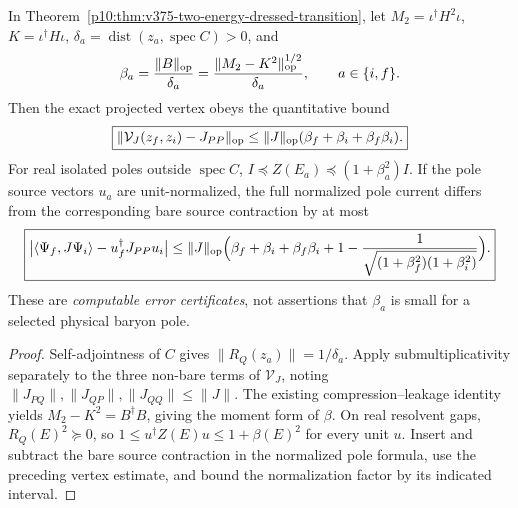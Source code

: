 \documentclass[12pt,a4paper]{article}
\begin{document}
\begin{corollary}
\label{p10:cor:v375-schur-current-error-bound}
In Theorem~\ref{p10:thm:v375-two-energy-dressed-transition}, let
$M_2=\iota^\dagger H^2\iota$, $K=\iota^\dagger H\iota$,
$\delta_a=\operatorname{dist}(z_a,\operatorname{spec}C)>0$, and
\[
 \beta_a=\frac{\|B\|_{\rm op}}{\delta_a}
 =\frac{\|M_2-K^2\|_{\rm op}^{1/2}}{\delta_a},
 \qquad a\in\{i,f\}.
\]
Then the exact projected vertex obeys the quantitative bound
\[
\boxed{\|\mathcal V_J(z_f,z_i)-J_{PP}\|_{\rm op}
 \le\|J\|_{\rm op}(\beta_f+\beta_i+\beta_f\beta_i).}
\]
For real isolated poles outside $\operatorname{spec}C$,
$ I\preceq Z(E_a)\preceq(1+\beta_a^2)I$.
If the pole source vectors $u_a$ are unit-normalized, the full
normalized pole current differs from the corresponding bare
source contraction by at most
\[
\boxed{\begin{aligned}
\big|\langle\Psi_f,J\Psi_i\rangle-u_f^\dagger J_{PP}u_i\big|
\le\|J\|_{\rm op}\Bigl(\beta_f+\beta_i+\beta_f\beta_i
 +1-\frac1{\sqrt{(1+\beta_f^2)(1+\beta_i^2)}}\Bigr).
\end{aligned}}
\]
These are \emph{computable error certificates}, not assertions that
$\beta_a$ is small for a selected physical baryon pole.
\end{corollary}
\begin{proof}
Self-adjointness of $C$ gives $\|R_Q(z_a)\|=1/\delta_a$.
Apply submultiplicativity separately to the three non-bare terms
of $\mathcal V_J$, noting $\|J_{PQ}\|,\|J_{QP}\|,\|J_{QQ}\|\le\|J\|$.
The existing compression--leakage identity yields
$M_2-K^2=B^\dagger B$, giving the moment form of $\beta$.
On real resolvent gaps, $R_Q(E)^2\succeq0$, so
$1\le u^\dagger Z(E)u\le1+\beta(E)^2$ for every unit $u$.
Insert and subtract the bare source contraction in the normalized
pole formula, use the preceding vertex estimate, and bound the
normalization factor by its indicated interval.
\end{proof}
\end{document}
